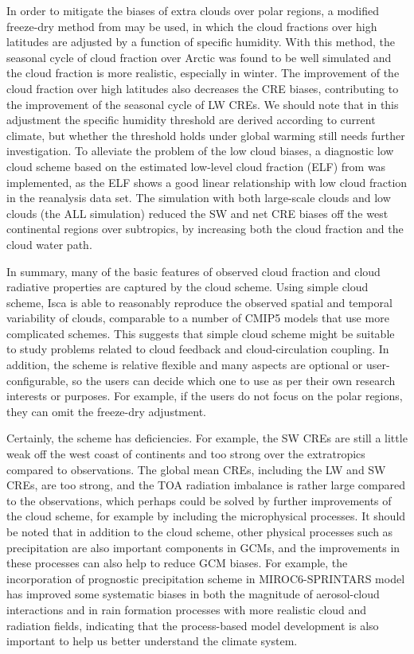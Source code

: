 In order to mitigate the biases of extra clouds over polar regions, a modified freeze-dry method from \cite{Vavrus2008} may be used, in which the cloud fractions over high latitudes are adjusted by a function of specific humidity. With this method, the seasonal cycle of cloud fraction over Arctic was found to be well simulated and the cloud fraction is more realistic, especially in winter. The improvement of the cloud fraction over high latitudes also decreases the CRE biases, contributing to the improvement of the seasonal cycle of LW CREs. We should note that in this adjustment the specific humidity threshold are derived according to current climate, but whether the threshold holds under global warming still needs further investigation. To alleviate the problem of the low cloud biases, a diagnostic low cloud scheme based on the estimated low-level cloud fraction (ELF) from \citet{Park2019} was implemented, as the ELF shows a good linear relationship with low cloud fraction in the reanalysis data set. The simulation with both large-scale clouds and low clouds (the ALL simulation) reduced the SW and net CRE biases off the west continental regions over subtropics, by increasing both the cloud fraction and the cloud water path.

In summary, many of the basic features of observed cloud fraction and cloud radiative properties are captured by the cloud scheme. Using simple cloud scheme, Isca is able to reasonably reproduce the observed spatial and temporal variability of clouds, comparable to a number of CMIP5 models that use more complicated schemes. This suggests that simple cloud scheme might be suitable to study problems related to cloud feedback and cloud-circulation coupling. In addition, the scheme is relative flexible and many aspects are optional or user-configurable, so the users can decide which one to use as per their own research interests or purposes. For example, if the users do not focus on the polar regions, they can omit the freeze-dry adjustment. 

Certainly, the scheme has deficiencies. For example, the SW CREs are still a little weak off the west coast of continents and too strong over the extratropics compared to observations. The global mean CREs, including the LW and SW CREs, are too strong, and the TOA radiation imbalance is rather large compared to the observations, which perhaps could be solved by further improvements of the cloud scheme, for example by including the microphysical processes. It should be noted that in addition to the cloud scheme, other physical processes such as precipitation are also important components in GCMs, and the improvements in these processes can also help to reduce GCM biases. For example, the incorporation of prognostic precipitation scheme in MIROC6-SPRINTARS model \citep{Michibata2019} has improved some systematic biases in both the magnitude of aerosol-cloud interactions and in rain formation processes with more realistic cloud and radiation fields, indicating that the process-based model development is also important to help us better understand the climate system.

